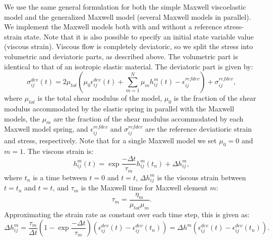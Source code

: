 We use the same general formulation for both the simple Maxwell
viscoelastic model and the generalized Maxwell model (several Maxwell
models in parallel). We implement the Maxwell models both with and
without a reference stress-strain state. Note that it is also possible
to specify an initial state variable value (viscous strain). Viscous
flow is completely deviatoric, so we split the stress into volumetric
and deviatoric parts, as described above.  The volumetric part is
identical to that of an isotropic elastic material. The deviatoric
part is given by:
\begin{equation}
  \sigma^\mathit{dev}_{ij}\left(t\right)=2\mu_{tot}\left(\mu_{0}\epsilon^\mathit{dev}_{ij}
    \left(t\right)+\sum_{m=1}^{N}\mu_{m}h^{m}_{ij}\left(t\right)-\epsilon^\mathit{refdev}_{ij}
    \right)+\sigma^\mathit{refdev}_{ij},
\end{equation}
where $\mu_{tot}$ is the total shear modulus of the model, $\mu_{0}$
is the fraction of the shear modulus accommodated by the elastic
spring in parallel with the Maxwell models, the $\mu_{m}$ are the
fraction of the shear modulus accommodated by each Maxwell model
spring, and $\epsilon^{\mathit{refdev}}_{ij}$ and
$\sigma^{\mathit{refdev}}_{ij}$ are the reference deviatioric strain
and stress, respectively. Note that for a single Maxwell model we set
${\mu}_0=0$ and $m=1$. The viscous strain is:
\begin{equation}
h^{m}_{ij}\left(t\right)=\exp\frac{-\Delta
  t}{\tau_{m}}h^{m}_{ij}\left(t_{n}\right)+\Delta h^{m}_{ij},
\end{equation}
where $t_{n}$ is a time between $t=0$ and $t=t$, $\Delta
h^{m}_{ij}$ is the viscous strain between $t=t_{n}$ and
$t=t$, and $\tau_{m}$ is the Maxwell time for Maxwell element $m$:
\begin{equation}
  \tau_{m}=\frac{\eta_{m}}{\mu_{tot}\mu_{m}}.
\end{equation}
Approximating the strain rate as constant over each time step,
this is given as:
\begin{equation}
\Delta h^{m}_{ij}=\frac{\tau_{m}}{\Delta t}\left(1-\exp\frac{-\Delta
  t}{\tau_{m}}\right)\left(\epsilon^{\mathit{dev}}_{ij}\left(t\right)-\epsilon^{\mathit{dev}}_{ij}\left(t_{n}\right)\right)=\Delta
h^{m}\left(\epsilon^{\mathit{dev}}_{ij}\left(t\right)-\epsilon^{\mathit{dev}}_{ij}\left(t_n\right)\right).
\end{equation}

